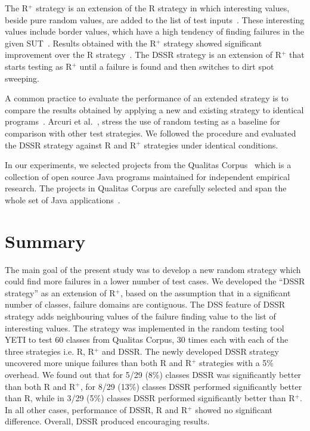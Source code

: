 The R$^+$ strategy is an extension of the R strategy in which interesting values, beside pure random values, are added to the list of test inputs~\cite{ciupa2007experimental, ciupa2008finding}. These interesting values include border values, which have a high tendency of finding failures in the given SUT~\cite{beizer2003software}. Results obtained with the R$^+$ strategy showed significant improvement over the R strategy~\cite{leitner2007reconciling}. The DSSR strategy is an extension of R$^+$ that starts testing as R$^+$ until a failure is found and then switches to dirt spot sweeping.



A common practice to evaluate the performance of an extended strategy is to compare the results obtained by applying a new and existing strategy to identical programs~\cite{hamlet1990partition, duran1984evaluation, gutjahr1999partition}. Arcuri et al.~\cite{arcuri2012random}, stress the use of random testing as a baseline for comparison with other test strategies. We followed the procedure and evaluated the DSSR strategy against R and R$^+$ strategies under identical conditions.

In our experiments, we selected projects from the Qualitas Corpus~\cite{tempero2010qualitas} which is a collection of open source Java programs maintained for independent empirical research. The projects in Qualitas Corpus are carefully selected and span the whole set of Java applications~\cite{oriol2012random, tempero2010empirical, tempero2008empirical}.




\section{Summary}\label{sec:conc}
The main goal of the present study was to develop a new random strategy which could find more failures in a lower number of test cases. We developed the ``DSSR strategy'' as an extension of R$^+$, based on the assumption that in a significant number of classes, failure domains are contiguous. The DSS feature of DSSR strategy adds neighbouring values of the failure finding value to the list of interesting values. The strategy was implemented in the random testing tool YETI to test 60 classes from Qualitas Corpus, 30 times each with each of the three strategies i.e. R, R$^+$ and DSSR. The newly developed DSSR strategy uncovered more unique failures than both R and R$^+$ strategies with a 5\% overhead. We found out that for 5/29 (8\%) classes DSSR was significantly better than both R and R$^+$, for 8/29 (13\%) classes DSSR performed significantly better than R, while in 3/29 (5\%) classes DSSR performed significantly better than R$^+$. In all other cases, performance of DSSR, R and R$^+$ showed no significant difference. Overall, DSSR produced encouraging results. 

